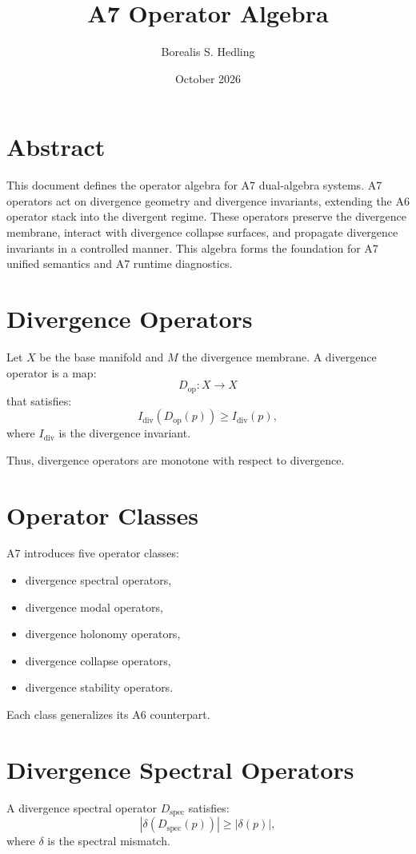 \documentclass[11pt]{article}
\title{A7 Operator Algebra}
\author{Borealis S. Hedling}
\date{October 2026}
\begin{document}
\maketitle

\section*{Abstract}
This document defines the operator algebra for A7 dual-algebra systems. A7
operators act on divergence geometry and divergence invariants, extending the
A6 operator stack into the divergent regime. These operators preserve the
divergence membrane, interact with divergence collapse surfaces, and propagate
divergence invariants in a controlled manner. This algebra forms the foundation
for A7 unified semantics and A7 runtime diagnostics.

\section{Divergence Operators}
Let $X$ be the base manifold and $M$ the divergence membrane. A divergence
operator is a map:
\[
D_{\text{op}} : X \to X
\]
that satisfies:
\[
I_{\text{div}}(D_{\text{op}}(p)) \geq I_{\text{div}}(p),
\]
where $I_{\text{div}}$ is the divergence invariant.

Thus, divergence operators are monotone with respect to divergence.

\section{Operator Classes}
A7 introduces five operator classes:
\begin{itemize}
  \item divergence spectral operators,
  \item divergence modal operators,
  \item divergence holonomy operators,
  \item divergence collapse operators,
  \item divergence stability operators.
\end{itemize}

Each class generalizes its A6 counterpart.

\section{Divergence Spectral Operators}
A divergence spectral operator $D_{\text{spec}}$ satisfies:
\[
| \delta(D_{\text{spec}}(p)) | \geq | \delta(p) |,
\]
where $\delta$ is the spectral mismatch.
\end{document}
